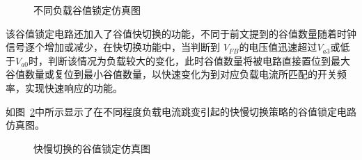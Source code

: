 \begin{figure}[htbp]
	\centering
	\caption{不同负载谷值锁定仿真图}
	\label{fig:谷值锁定放大仿真图}
\end{figure}

该谷值锁定电路还加入了谷值快切换的功能，不同于前文提到的谷值数量随着时钟信号逐个增加或减少，在快切换功能中，当判断到
$V_{FB}$的电压值迅速超过$V_{a3}$或低于$V_{a0}$时，判断该情况为负载较大的变化，此时谷值数量将被电路直接置位到最大谷值数量或复位到最小谷值数量，以快速变化为到对应负载电流所匹配的开关频率，实现快速响应的功能。



如图~\ref{fig:快慢切换的谷值锁定仿真图}中所示显示了在不同程度负载电流跳变引起的快慢切换策略的谷值锁定电路仿真图。

\begin{figure}[htbp]
	\centering
	\caption{快慢切换的谷值锁定仿真图}
	\label{fig:快慢切换的谷值锁定仿真图}
\end{figure}

